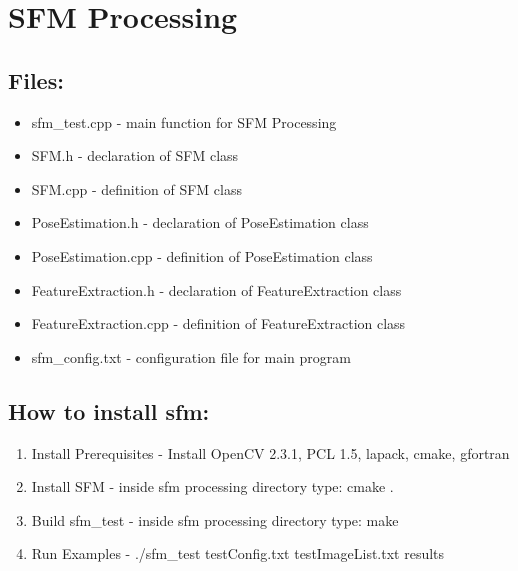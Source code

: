 \documentclass[12pt]{article}
\begin{document}
\section{SFM Processing}
\subsection{Files:}
\begin{itemize}
	\item{sfm\_test.cpp} - main function for SFM Processing
	\item{SFM.h} - declaration of SFM class
	\item{SFM.cpp} - definition of SFM class
	\item{PoseEstimation.h} - declaration of PoseEstimation class
	\item{PoseEstimation.cpp} - definition of PoseEstimation class
	\item{FeatureExtraction.h} - declaration of FeatureExtraction class
	\item{FeatureExtraction.cpp} - definition of FeatureExtraction class
	\item{sfm\_config.txt} - configuration file for main program
\end{itemize}


\subsection{How to install sfm:}
\begin{enumerate}
	\item{Install Prerequisites} - Install OpenCV 2.3.1, PCL 1.5, lapack, cmake, gfortran
	\item{Install SFM} - inside sfm processing directory type: cmake .
	\item{Build sfm\_test} - inside sfm processing directory type: make
	\item{Run Examples} - ./sfm\_test testConfig.txt testImageList.txt results
\end{enumerate}
\end{document}
